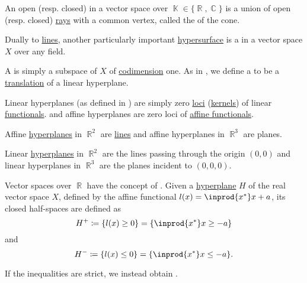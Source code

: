 \begin{definition}\label{def:geometric_cone}
  An open (resp. closed)  in a vector space over \( \BbbK \in \{ \BbbR, \BbbC \} \) is a union of open (resp. closed) \hyperref[def:geometric_ray]{rays} with a common vertex, called the  of the cone.
\end{definition}

\begin{definition}\label{def:hyperplane}
  Dually to \hyperref[def:geometric_line]{lines}, another particularly important \hyperref[def:hypersurface]{hypersurface} is a  in a vector space \( X \) over any field.

  \begin{thmenum}
     A  is simply a subspace of \( X \) of \hyperref[def:vector_space_dimension]{codimension} one. As in , we define a  to be a \hyperref[def:euclidean_transformation/translation]{translation} of a linear hyperplane.

     Linear hyperplanes (as defined in ) are simply zero \hyperref[def:zero_locus]{loci} (\hyperref[def:semiring_kernel]{kernels}) of linear \hyperref[def:linear_operator]{functionals}. and affine hyperplanes are zero loci of \hyperref[def:affine_operator]{affine functionals}.
  \end{thmenum}
\end{definition}

\begin{example}\label{ex:hyperplanes}
  Affine \hyperref[def:hyperplane]{hyperplanes} in \( \BbbR^2 \) are \hyperref[def:geometric_line]{lines} and affine hyperplanes in \( \BbbR^3 \) are planes.

  Linear \hyperref[def:hyperplane]{hyperplanes} in \( \BbbR^2 \) are the lines passing through the origin \( (0, 0) \) and linear hyperplanes in \( \BbbR^3 \) are the planes incident to \( (0, 0, 0) \).
\end{example}

\begin{definition}\label{def:half_space}
  Vector spaces over \( \BbbR \) have the concept of . Given a \hyperref[def:hyperplane]{hyperplane} \( H \) of the real vector space \( X \), defined by the affine functional \( l(x) = \inprod {x^*} x + a \), its closed half-spaces are defined as
  \begin{equation*}
    H^+ \coloneqq \{ l(x) \geq 0 \} = \{ \inprod {x^*} x \geq -a \}
  \end{equation*}
  and
  \begin{equation*}
    H^- \coloneqq \{ l(x) \leq 0 \} = \{ \inprod {x^*} x \leq -a \}.
  \end{equation*}

  If the inequalities are strict, we instead obtain .
\end{definition}

